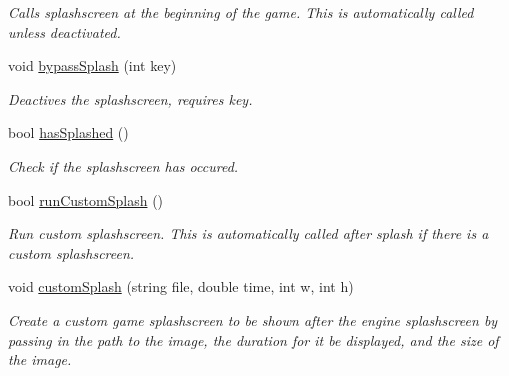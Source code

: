 \begin{DoxyCompactItemize}
\begin{DoxyCompactList}\small\item\em Calls splashscreen at the beginning of the game. This is automatically called unless deactivated. \end{DoxyCompactList}\item 
void \hyperlink{classEngine_a3b9cf8a050f43e4e185748f7b2a3ded8}{bypass\+Splash} (int key)\hypertarget{classEngine_a3b9cf8a050f43e4e185748f7b2a3ded8}{}\label{classEngine_a3b9cf8a050f43e4e185748f7b2a3ded8}

\begin{DoxyCompactList}\small\item\em Deactives the splashscreen, requires key. \end{DoxyCompactList}\item 
bool \hyperlink{classEngine_aabab82c2ba4dca772a28dbbd4fe08cb4}{has\+Splashed} ()\hypertarget{classEngine_aabab82c2ba4dca772a28dbbd4fe08cb4}{}\label{classEngine_aabab82c2ba4dca772a28dbbd4fe08cb4}

\begin{DoxyCompactList}\small\item\em Check if the splashscreen has occured. \end{DoxyCompactList}\item 
bool \hyperlink{classEngine_a5c87c90c9dd6b3fd652e24af0c7e935d}{run\+Custom\+Splash} ()\hypertarget{classEngine_a5c87c90c9dd6b3fd652e24af0c7e935d}{}\label{classEngine_a5c87c90c9dd6b3fd652e24af0c7e935d}

\begin{DoxyCompactList}\small\item\em Run custom splashscreen. This is automatically called after splash if there is a custom splashscreen. \end{DoxyCompactList}\item 
void \hyperlink{classEngine_a0960e415d0b9ed92099eee6677d7ea51}{custom\+Splash} (string file, double time, int w, int h)\hypertarget{classEngine_a0960e415d0b9ed92099eee6677d7ea51}{}\label{classEngine_a0960e415d0b9ed92099eee6677d7ea51}

\begin{DoxyCompactList}\small\item\em Create a custom game splashscreen to be shown after the engine splashscreen by passing in the path to the image, the duration for it be displayed, and the size of the image. \end{DoxyCompactList}\end{DoxyCompactItemize}



